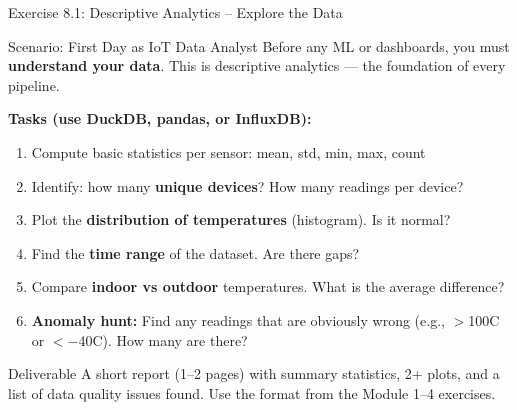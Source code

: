 \documentclass[aspectratio=169,11pt]{beamer}
\begin{document}
\begin{frame}{Exercise 8.1: Descriptive Analytics -- Explore the Data}
    \begin{block}{Scenario: First Day as IoT Data Analyst}
        Before any ML or dashboards, you must \textbf{understand your data}. This is descriptive analytics --- the foundation of every pipeline.
    \end{block}

    \vspace{0.2cm}
    \textbf{Tasks (use DuckDB, pandas, or InfluxDB):}
    \begin{enumerate}
        \item Compute basic statistics per sensor: mean, std, min, max, count
        \item Identify: how many \textbf{unique devices}? How many readings per device?
        \item Plot the \textbf{distribution of temperatures} (histogram). Is it normal?
        \item Find the \textbf{time range} of the dataset. Are there gaps?
        \item Compare \textbf{indoor vs outdoor} temperatures. What is the average difference?
        \item \textbf{Anomaly hunt:} Find any readings that are obviously wrong (e.g., $>$100\textdegree C or $<$$-$40\textdegree C). How many are there?
    \end{enumerate}

    \vspace{0.1cm}
    \begin{alertblock}{Deliverable}
        A short report (1--2 pages) with summary statistics, 2+ plots, and a list of data quality issues found. Use the format from the Module 1--4 exercises.
    \end{alertblock}
\end{frame}
\end{document}
